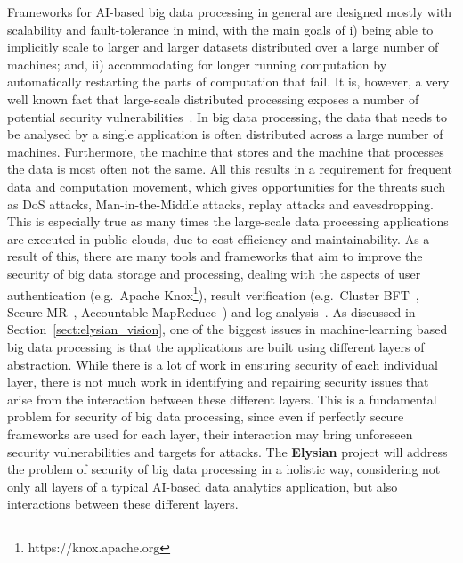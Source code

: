 \documentclass[a4paper,11pt]{article}
\newcommand{\project}[1]{\textbf{#1}\xspace}
\newcommand{\SECURITY}{\project{Elysian}}
\newcommand{\TheProject}{\SECURITY}
\begin{document}
Frameworks for AI-based big data processing in general are designed mostly with scalability and fault-tolerance in mind, with the main goals of i) being able to implicitly scale to larger and larger datasets distributed over a large number of machines; and, ii) accommodating for longer running computation by automatically restarting the parts of computation that fail. It is, however, a very well known fact that large-scale distributed processing exposes a number of potential security vulnerabilities~\cite{bigdatasecurity}. In big data processing, the data that needs to be analysed by a single application is often distributed across a large number of machines. Furthermore, the machine that stores and the machine that processes the data is most often not the same. All this results in a requirement for frequent data and computation movement, which gives opportunities for the threats such as DoS attacks, Man-in-the-Middle attacks, replay attacks and eavesdropping. This is especially true as many times the large-scale data processing applications are executed in public clouds, due to cost efficiency and maintainability. As a result of this, there are many tools and frameworks that aim to improve the security of big data storage and processing, dealing with the aspects of user authentication (e.g.~Apache Knox\footnote{https://knox.apache.org}), result verification (e.g.~Cluster BFT~\cite{bft}, Secure MR~\cite{securemr}, Accountable MapReduce~\cite{accountablemr}) and log analysis~\cite{loganalysis}. 
%
As discussed in Section~\ref{sect:elysian_vision}, one of the biggest issues in machine-learning based big data processing is that the applications are built using different layers of abstraction. While there is a lot of work in ensuring security of each individual layer, there is not much work in identifying and repairing security issues that arise from the interaction between these different layers. This is a fundamental problem for security of big data processing, since even if perfectly secure frameworks are used for each layer, their interaction may bring unforeseen security vulnerabilities and targets for attacks. The \TheProject{} project will address the problem of security of big data processing in a holistic way, considering not only all layers of a typical AI-based data analytics application, but also interactions between these different layers.
\end{document}
